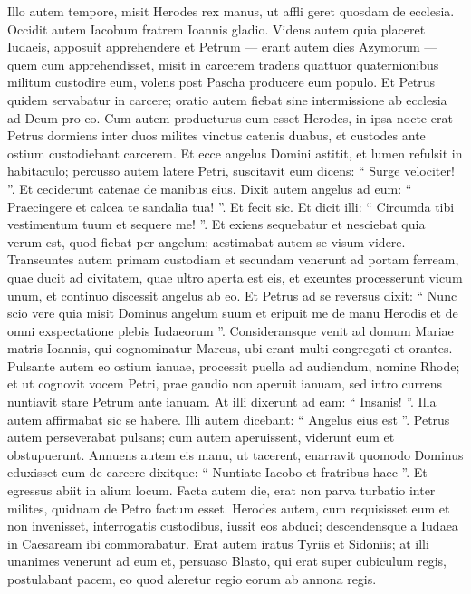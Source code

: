 \begin{biblechapter}
\begin{biblechapter}
\begin{biblechapter}
\begin{biblechapter}
\begin{biblechapter}
\begin{biblechapter}
\begin{biblechapter}
\begin{biblechapter}
\begin{biblechapter}
\begin{biblechapter}
\begin{biblechapter}
\begin{biblechapter}
\verse Illo autem tempore, misit Herodes rex manus, ut affli geret quosdam de ecclesia. 
\verse Occidit autem Iacobum fratrem Ioannis gladio. 
\verse Videns autem quia placeret Iudaeis, apposuit apprehendere et Petrum — erant autem dies Azymorum — 
\verse quem cum apprehendisset, misit in carcerem tradens quattuor quaternionibus militum custodire eum, volens post Pascha producere eum populo. 
 \verse Et Petrus quidem servabatur in carcere; oratio autem fiebat sine intermissione ab ecclesia ad Deum pro eo. 
\verse Cum autem producturus eum esset Herodes, in ipsa nocte erat Petrus dormiens inter duos milites vinctus catenis duabus, et custodes ante ostium custodiebant carcerem. 
\verse Et ecce angelus Domini astitit, et lumen refulsit in habitaculo; percusso autem latere Petri, suscitavit eum dicens: “ Surge velociter! ”. Et ceciderunt catenae de manibus eius. 
\verse Dixit autem angelus ad eum: “ Praecingere et calcea te sandalia tua! ”. Et fecit sic. Et dicit illi: “ Circumda tibi vestimentum tuum et sequere me! ”. 
\verse Et exiens sequebatur et nesciebat quia verum est, quod fiebat per angelum; aestimabat autem se visum videre.
 \verse Transeuntes autem primam custodiam et secundam venerunt ad portam ferream, quae ducit ad civitatem, quae ultro aperta est eis, et exeuntes processerunt vicum unum, et continuo discessit angelus ab eo. 
\verse Et Petrus ad se reversus dixit: “ Nunc scio vere quia misit Dominus angelum suum et eripuit me de manu Herodis et de omni exspectatione plebis Iudaeorum ”. 
\verse Consideransque venit ad domum Mariae matris Ioannis, qui cognominatur Marcus, ubi erant multi congregati et orantes. 
\verse Pulsante autem eo ostium ianuae, processit puella ad audiendum, nomine Rhode; 
\verse et ut cognovit vocem Petri, prae gaudio non aperuit ianuam, sed intro currens nuntiavit stare Petrum ante ianuam. 
\verse At illi dixerunt ad eam: “ Insanis! ”. Illa autem affirmabat sic se habere. Illi autem dicebant: “ Angelus eius est ”. 
\verse Petrus autem perseverabat pulsans; cum autem aperuissent, viderunt eum et obstupuerunt. 
\verse Annuens autem eis manu, ut tacerent, enarravit quomodo Dominus eduxisset eum de carcere dixitque: “ Nuntiate Iacobo ct fratribus haec ”. Et egressus abiit in alium locum.
 \verse Facta autem die, erat non parva turbatio inter milites, quidnam de Petro factum esset. 
\verse Herodes autem, cum requisisset eum et non invenisset, interrogatis custodibus, iussit eos abduci; descendensque a Iudaea in Caesaream ibi commorabatur.
 \verse Erat autem iratus Tyriis et Sidoniis; at illi unanimes venerunt ad eum et, persuaso Blasto, qui erat super cubiculum regis, postulabant pacem, eo quod aleretur regio eorum ab annona regis. 

\end{biblechapter}
\end{biblechapter}
\end{biblechapter}
\end{biblechapter}
\end{biblechapter}
\end{biblechapter}
\end{biblechapter}
\end{biblechapter}
\end{biblechapter}
\end{biblechapter}
\end{biblechapter}
\end{biblechapter}
